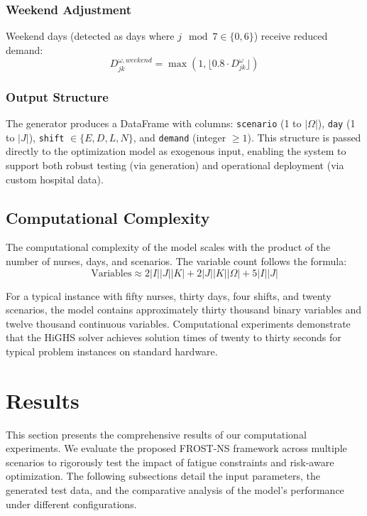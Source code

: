 \documentclass[10pt,a4paper,twocolumn]{article}
\begin{document}
\subsubsection{Weekend Adjustment}
Weekend days (detected as days where $j \mod 7 \in \{0, 6\}$) receive reduced demand:
\begin{equation}
D_{jk}^{\omega,weekend} = \max(1, \lfloor 0.8 \cdot D_{jk}^{\omega} \rfloor)
\end{equation}

\subsubsection{Output Structure}
The generator produces a DataFrame with columns: \texttt{scenario} (1 to $|\Omega|$), \texttt{day} (1 to $|J|$), \texttt{shift} $\in \{E, D, L, N\}$, and \texttt{demand} (integer $\geq 1$). This structure is passed directly to the optimization model as exogenous input, enabling the system to support both robust testing (via generation) and operational deployment (via custom hospital data).

\subsection{Computational Complexity}

The computational complexity of the model scales with the product of the number of nurses, days, and scenarios. The variable count follows the formula:
\begin{equation}
\text{Variables} \approx 2|I||J||K| + 2|J||K||\Omega| + 5|I||J|
\end{equation}

For a typical instance with fifty nurses, thirty days, four shifts, and twenty scenarios, the model contains approximately thirty thousand binary variables and twelve thousand continuous variables. Computational experiments demonstrate that the HiGHS solver achieves solution times of twenty to thirty seconds for typical problem instances on standard hardware.

\section{Results}
This section presents the comprehensive results of our computational experiments. We evaluate the proposed FROST-NS framework across multiple scenarios to rigorously test the impact of fatigue constraints and risk-aware optimization. The following subsections detail the input parameters, the generated test data, and the comparative analysis of the model's performance under different configurations.
\end{document}
